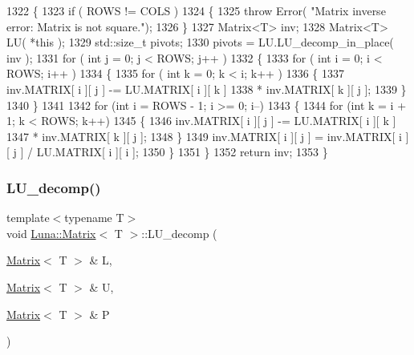 \begin{DoxyCode}
1322   \{
1323     \textcolor{keywordflow}{if} ( ROWS != COLS )
1324     \{
1325       \textcolor{keywordflow}{throw} Error( \textcolor{stringliteral}{"Matrix inverse error: Matrix is not square."});
1326     \}
1327     Matrix<T> inv;
1328     Matrix<T> LU( *\textcolor{keyword}{this} );
1329     std::size\_t pivots;
1330     pivots = LU.LU\_decomp\_in\_place( inv );
1331     \textcolor{keywordflow}{for} ( \textcolor{keywordtype}{int} j = 0; j < ROWS; j++ )
1332     \{
1333         \textcolor{keywordflow}{for} ( \textcolor{keywordtype}{int} i = 0; i < ROWS; i++ )
1334         \{
1335             \textcolor{keywordflow}{for} ( \textcolor{keywordtype}{int} k = 0; k < i; k++ )
1336             \{
1337                 inv.MATRIX[ i ][ j ] -= LU.MATRIX[ i ][ k ]
1338                                       * inv.MATRIX[ k ][ j ];
1339             \}
1340         \}
1341 
1342         \textcolor{keywordflow}{for} (\textcolor{keywordtype}{int} i = ROWS - 1; i >= 0; i--)
1343         \{
1344             \textcolor{keywordflow}{for} (\textcolor{keywordtype}{int} k = i + 1; k < ROWS; k++)
1345             \{
1346                 inv.MATRIX[ i ][ j ] -= LU.MATRIX[ i ][ k ]
1347                                       * inv.MATRIX[ k ][ j ];
1348             \}
1349             inv.MATRIX[ i ][ j ] = inv.MATRIX[ i ][ j ] / LU.MATRIX[ i ][ i ];
1350         \}
1351     \}
1352     \textcolor{keywordflow}{return} inv;
1353   \}
\end{DoxyCode}
\mbox{\label{classLuna_1_1Matrix_a5a351581d939027d62d77a87a42bbbcd}} 
\subsubsection{\texorpdfstring{L\+U\+\_\+decomp()}{LU\_decomp()}}
{\footnotesize\ttfamily template$<$typename T$>$ \\
void \hyperlink{classLuna_1_1Matrix}{Luna\+::\+Matrix}$<$ T $>$\+::L\+U\+\_\+decomp (\begin{DoxyParamCaption}\item[{\hyperlink{classLuna_1_1Matrix}{Matrix}$<$ T $>$ \&}]{L,  }\item[{\hyperlink{classLuna_1_1Matrix}{Matrix}$<$ T $>$ \&}]{U,  }\item[{\hyperlink{classLuna_1_1Matrix}{Matrix}$<$ T $>$ \&}]{P }\end{DoxyParamCaption})\hspace{0.3cm}{\ttfamily [inline]}}



